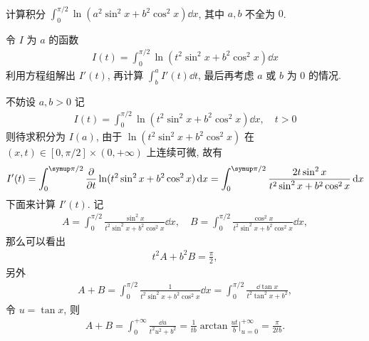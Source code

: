 \documentclass{ctexart}
\begin{document}
\begin{exercise}[resume=exer]
\begin{exercise}
\begin{align*}
            \end{align*}
        \end{exercise}
        \item 计算积分 $ \int_{0}^{\pi/2} \ln (a^{2}\sin^{2}x + b^{2}\cos^{2}x) \dd{x} $, 其中 $ a, b $ 不全为 $ 0 $.
        \begin{hint}
            令 $ I $ 为 $ a $ 的函数
            \begin{align*}
                I(t) = \int_{0}^{\pi/2} \ln (t^{2}\sin^{2}x + b^{2}\cos^{2}x) \dd{x}
            \end{align*}
            利用方程组解出 $ I'(t) $, 再计算 $ \int_{b}^{a} I'(t) \dd{t} $, 最后再考虑 $ a $ 或 $ b $ 为 $ 0 $ 的情况. 
        \end{hint}
        \begin{answer}
            不妨设 $ a, b > 0 $ 记
            \begin{align*}
                I(t) = \int_{0}^{\pi/2} \ln (t^{2}\sin^{2}x + b^{2}\cos^{2}x) \dd{x}, \quad t > 0
            \end{align*}
            则待求积分为 $ I(a) $, 由于 $ \ln (t^{2}\sin^{2}x + b^{2}\cos^{2}x) $ 在 $ (x, t) \in [0, \pi/2]\times(0, +\infty) $ 上连续可微, 故有
            \begin{align*}
                I'(t) = \int_{0}^{\pi/2} \pdv{t}\ln (t^{2}\sin^{2}x + b^{2}\cos^{2}x) \dd{x} = \int_{0}^{\pi/2} \frac{2t\sin^{2}x}{t^{2}\sin^{2}x + b^{2}\cos^{2}x} \dd{x}
            \end{align*}
            下面来计算 $ I'(t) $. 记
            \begin{align*}
                A = \int_{0}^{\pi/2} \frac{\sin^{2}x}{t^{2}\sin^{2}x + b^{2}\cos^{2}x} \dd{x}, \quad B = \int_{0}^{\pi/2} \frac{\cos^{2}x}{t^{2}\sin^{2}x + b^{2}\cos^{2}x} \dd{x},
            \end{align*}
            那么可以看出
            \begin{align}\label{eq:t2A+b2B}
                t^{2}A + b^{2}B = \frac{\pi}{2},
            \end{align}
            另外
            \begin{align*}
                A + B = \int_{0}^{\pi/2} \frac{1}{t^{2}\sin^{2}x + b^{2}\cos^{2}x} \dd{x} = \int_{0}^{\pi/2} \frac{\dd\tan x}{t^{2}\tan^{2}x + b^{2}},
            \end{align*}
            令 $ u = \tan x $, 则
            \begin{align}\label{eq:A+B=pi/2tb}
                A + B = \int_{0}^{+\infty} \frac{\dd u}{t^{2}u^{2} + b^{2}} = \frac{1}{tb}\arctan\frac{ut}{b}\bigg|_{u = 0}^{+\infty } = \frac{\pi}{2tb}.

\end{align}
\end{answer}
\end{exercise}
\end{document}
